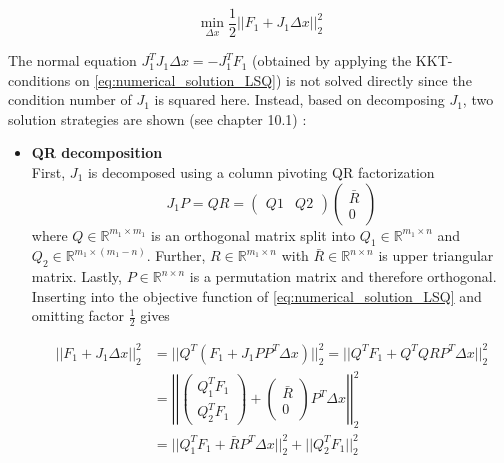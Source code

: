 \documentclass{scrartcl}[12pt, halfparskip]
\numberwithin{equation}{section}
\numberwithin{figure}{section}
\numberwithin{table}{section}
\begin{document}
\begin{equation}
\min_{\Delta x} \frac{1}{2} || F_1 + J_1 \Delta x ||_2^2
\label{eq:numerical_solution_LSQ}
\end{equation}

The normal equation $J_1^T J_1 \Delta x = -J_1^T F_1$ (obtained by applying the KKT-conditions on \cref{eq:numerical_solution_LSQ}) is not solved directly since the condition number of $J_1$ is squared here.
Instead, based on decomposing $J_1$, two solution strategies are shown (see \cite{nonlinear_optimiziation_wright} chapter 10.1) :

\begin{itemize}
	\item \textbf{QR decomposition} \\
	First, $J_1$ is decomposed using a column pivoting QR factorization
	\begin{equation}
		J_1 P = Q R = 
		\begin{pmatrix}
			Q1 & Q2
		\end{pmatrix}
		\begin{pmatrix}
			\bar{R} \\
			0
		\end{pmatrix}
	\end{equation}
	where $Q \in \mathbb{R}^{m_1 \times m_1}$ is an orthogonal matrix split into $Q_1 \in \mathbb{R}^{m_1 \times n}$ and $Q_2 \in \mathbb{R}^{m_1 \times (m_1-n)}$. Further, $R \in \mathbb{R}^{m_1 \times n}$ with $\bar{R} \in \mathbb{R}^{n \times n}$ is upper triangular matrix. Lastly, $P \in \mathbb{R}^{n \times n}$ is a permutation matrix and therefore orthogonal. Inserting into the objective function of \cref{eq:numerical_solution_LSQ} and omitting factor $\frac{1}{2}$ gives
	
	\begin{align}
		|| F_1 + J_1 \Delta x ||_2^2 & = || Q^T (F_1 + J_1 P P^T \Delta x) ||_2^2 = || Q^T F_1 + Q^T Q R P^T \Delta x ||_2^2 \\
		& = \left| \left| \begin{pmatrix}
		Q_1^T F_1 \\
		Q_2^T F_1
		\end{pmatrix} + 
		\begin{pmatrix}
		\bar{R} \\
		0
		\end{pmatrix}
		P^T \Delta x \right| \right|_2^2 \nonumber \\
		& = || Q_1^T F_1 + \bar{R} P^T \Delta x ||_2^2 + ||Q_2^T F_1 ||_2^2 \nonumber
	\end{align}
	

\end{itemize}
\end{document}
